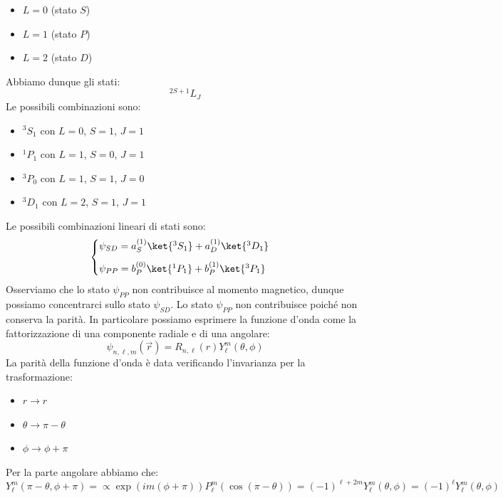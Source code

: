 \begin{itemize}
 \item $L=0$ (stato $S$)
 \item $L=1$ (stato $P$)
 \item $L=2$ (stato $D$)
\end{itemize}
Abbiamo dunque gli stati:
\begin{equation}
 ^{2S+1}L_J
\end{equation}
Le possibili combinazioni sono:
\begin{itemize}
 \item $^3S_1$ con $L=0$, $S=1$, $J=1$
 \item $^1P_1$ con $L=1$, $S=0$, $J=1$
 \item $^3P_0$ con $L=1$, $S=1$, $J=0$
 \item $^3D_1$ con $L=2$, $S=1$, $J=1$
\end{itemize}
Le possibili combinazioni lineari di stati sono:
\begin{equation}
 \begin{cases}
  \psi_{SD} = a_S^{(1)}\ket{^3S_1} + a_D^{(1)} \ket{^3D_1} \\[8pt]
  \psi_{PP} = b_P^{(0)} \ket{^1P_1} + b_P^{(1)} \ket{^3P_1}
 \end{cases}
\end{equation}
Osserviamo che lo stato $\psi_{PP}$ non contribuisce al momento magnetico, dunque possiamo concentrarci sullo stato $\psi_{SD}$.
Lo stato $\psi_{PP}$ non contribuisce poiché non conserva la parità. In particolare possiamo esprimere la funzione d'onda come la fattorizzazione di una componente radiale e di una angolare:
\begin{equation}
  \psi_{n,\ell,m}(\vec{r}) = R_{n,\ell}(r) Y_{\ell}^{m}(\theta,\phi)
\end{equation}
La parità della funzione d'onda è data verificando l'invarianza per la trasformazione:
\begin{itemize}
  \item $r \rightarrow r$
  \item $\theta \rightarrow \pi - \theta$
  \item $\phi \rightarrow \phi + \pi$
\end{itemize}
Per la parte angolare abbiamo che:
\begin{equation}
 Y_{\ell}^{m}(\pi - \theta, \phi + \pi) = \propto \exp(i m (\phi + \pi)) P_{\ell}^{m}(\cos(\pi - \theta)) = (-1)^{\ell + 2m} Y_{\ell}^{m}(\theta, \phi) = (-1)^\ell Y_{\ell}^{m}(\theta, \phi)
\end{equation}
